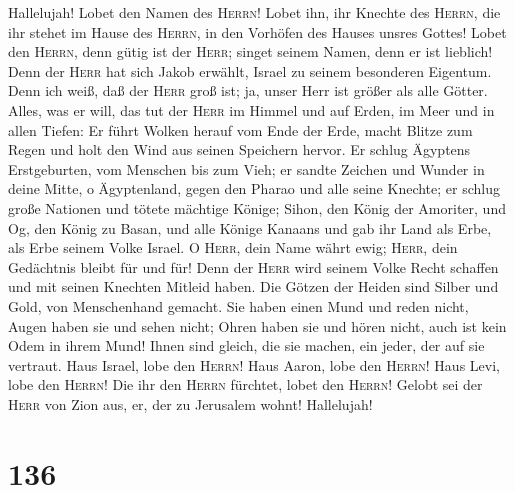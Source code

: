  Hallelujah! Lobet den Namen des \textsc{Herrn}! Lobet
ihn, ihr Knechte des \textsc{Herrn},  die ihr stehet im
Hause des \textsc{Herrn}, in den Vorhöfen des Hauses unsres Gottes!
 Lobet den \textsc{Herrn}, denn gütig ist der
\textsc{Herr}; singet seinem Namen, denn er ist lieblich! 
Denn der \textsc{Herr} hat sich Jakob erwählt, Israel zu seinem
besonderen Eigentum.  Denn ich weiß, daß der \textsc{Herr}
groß ist; ja, unser Herr ist größer als alle Götter. 
Alles, was er will, das tut der \textsc{Herr} im Himmel und auf Erden,
im Meer und in allen Tiefen:  Er führt Wolken herauf vom
Ende der Erde, macht Blitze zum Regen und holt den Wind aus seinen
Speichern hervor.  Er schlug Ägyptens Erstgeburten, vom
Menschen bis zum Vieh;  er sandte Zeichen und Wunder in
deine Mitte, o Ägyptenland, gegen den Pharao und alle seine Knechte;
 er schlug große Nationen und tötete mächtige Könige;
 Sihon, den König der Amoriter, und Og, den König zu
Basan, und alle Könige Kanaans  und gab ihr Land als
Erbe, als Erbe seinem Volke Israel.  O \textsc{Herr},
dein Name währt ewig; \textsc{Herr}, dein Gedächtnis bleibt für und für!
 Denn der \textsc{Herr} wird seinem Volke Recht schaffen
und mit seinen Knechten Mitleid haben.  Die Götzen der
Heiden sind Silber und Gold, von Menschenhand gemacht. 
Sie haben einen Mund und reden nicht, Augen haben sie und sehen nicht;
 Ohren haben sie und hören nicht, auch ist kein Odem in
ihrem Mund!  Ihnen sind gleich, die sie machen, ein
jeder, der auf sie vertraut.  Haus Israel, lobe den
\textsc{Herrn}! Haus Aaron, lobe den \textsc{Herrn}! 
Haus Levi, lobe den \textsc{Herrn}! Die ihr den \textsc{Herrn} fürchtet,
lobet den \textsc{Herrn}!  Gelobt sei der \textsc{Herr}
von Zion aus, er, der zu Jerusalem wohnt! Hallelujah!

\hypertarget{section-135}{%
\section{136}\label{section-135}}

